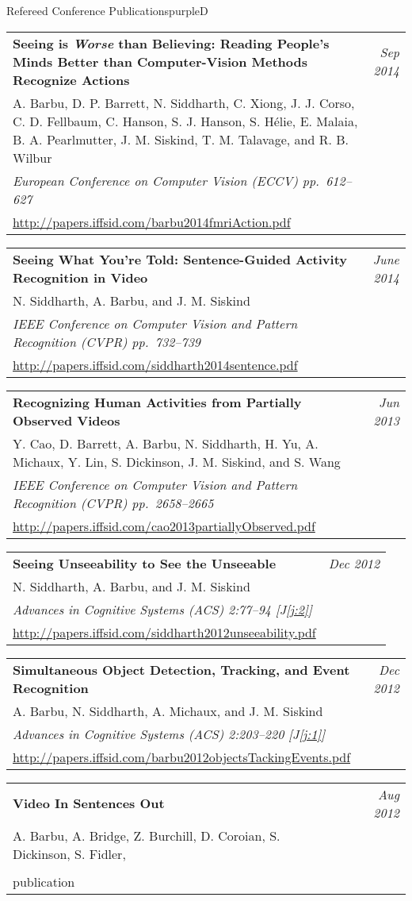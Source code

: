 \documentclass[a4paper]{article}
\makeatletter
\newlength{\itemtextwidth}
\newenvironment{publication}[5]
{ \item
  \begin{tabular*}{\itemtextwidth}{@{}p{5.6in}@{\extracolsep{\fill}}r@{}}
    \textbf{#1} & \textit{#2}\\ #3 &\\ \textit{#4}&\\ #5
  \end{tabular*}
  \vspace*{-2pt}
} {}
\def\item{\addtocounter{enumi}{-2}\oldItem}
\makeatother
\begin{document}
\begin{region}[C][9]{Refereed Conference Publications}{purpleD}
  \begin{publication} {Seeing is \emph{Worse} than Believing: Reading People’s Minds
      Better than Computer-Vision Methods Recognize Actions}
    {Sep 2014}
    {A. Barbu, D. P. Barrett, N. Siddharth, C. Xiong, J. J. Corso, C. D. Fellbaum,
      C. Hanson, S. J. Hanson, S. H\'elie, E. Malaia, B. A. Pearlmutter,
      J. M. Siskind, T. M. Talavage, and R. B. Wilbur}
    {European Conference on Computer Vision (ECCV) \hfill \emph{pp.~612--627}}
    {\url{http://papers.iffsid.com/barbu2014fmriAction.pdf}}
  \end{publication}
  \begin{publication} {Seeing What You're Told: Sentence-Guided Activity Recognition in Video}
    {June 2014}
    {N. Siddharth, A. Barbu, and J. M. Siskind}
    {IEEE Conference on Computer Vision and Pattern Recognition (CVPR) \hfill \emph{pp.~732--739}}
    {\url{http://papers.iffsid.com/siddharth2014sentence.pdf}}
  \end{publication}
  \begin{publication} {Recognizing Human Activities from Partially Observed Videos}
    {Jun 2013}
    {Y. Cao, D. Barrett, A. Barbu, N. Siddharth, H. Yu, A. Michaux, Y. Lin,
      S. Dickinson, J. M. Siskind, and S. Wang}
    {IEEE Conference on Computer Vision and Pattern Recognition (CVPR) \hfill \emph{pp.~2658--2665}}
    {\url{http://papers.iffsid.com/cao2013partiallyObserved.pdf}}
  \end{publication}
  \begin{publication} {Seeing Unseeability to See the Unseeable}
    {Dec 2012}
    {N. Siddharth, A. Barbu, and J. M. Siskind}
    {Advances in Cognitive Systems (ACS) \hfill \emph{2:77--94} [{\color{blueGreen}J\ref{j:2}}]}
    {\url{http://papers.iffsid.com/siddharth2012unseeability.pdf}}
  \end{publication}
  \begin{publication} {Simultaneous Object Detection, Tracking, and Event Recognition}
    {Dec 2012}
    {A. Barbu, N. Siddharth, A. Michaux, and J. M. Siskind}
    {Advances in Cognitive Systems (ACS) \hfill \emph{2:203--220} [{\color{blueGreen}J\ref{j:1}}]}
    {\url{http://papers.iffsid.com/barbu2012objectsTackingEvents.pdf}}
  \end{publication}
  \begin{publication} {Video In Sentences Out}
    {Aug 2012}
    {A. Barbu, A. Bridge, Z. Burchill, D. Coroian, S. Dickinson, S. Fidler,
}
\end{publication}
\end{region}
\end{document}
